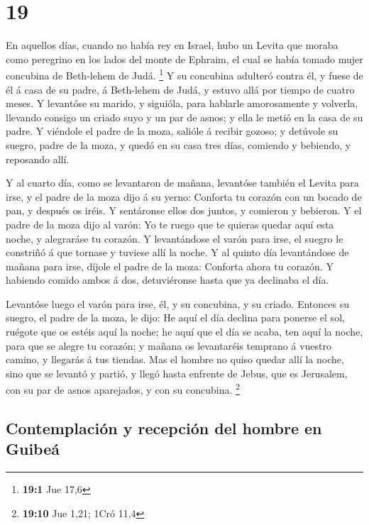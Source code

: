 \hypertarget{section-18}{%
\section{19}\label{section-18}}

 En aquellos días, cuando no había rey en Israel, hubo un
Levita que moraba como peregrino en los lados del monte de Ephraim, el
cual se había tomado mujer concubina de Beth-lehem de Judá. \footnote{\textbf{19:1}
  Jue 17,6}  Y su concubina adulteró contra él, y fuese de
él á casa de su padre, á Beth-lehem de Judá, y estuvo allá por tiempo de
cuatro meses.  Y levantóse su marido, y siguióla, para
hablarle amorosamente y volverla, llevando consigo un criado suyo y un
par de asnos; y ella le metió en la casa de su padre.  Y
viéndole el padre de la moza, salióle á recibir gozoso; y detúvole su
suegro, padre de la moza, y quedó en su casa tres días, comiendo y
bebiendo, y reposando allí.

 Y al cuarto día, como se levantaron de mañana, levantóse
también el Levita para irse, y el padre de la moza dijo á su yerno:
Conforta tu corazón con un bocado de pan, y después os iréis.
 Y sentáronse ellos dos juntos, y comieron y bebieron. Y
el padre de la moza dijo al varón: Yo te ruego que te quieras quedar
aquí esta noche, y alegraráse tu corazón.  Y levantándose
el varón para irse, el suegro le constriñó á que tornase y tuviese allí
la noche.  Y al quinto día levantándose de mañana para
irse, díjole el padre de la moza: Conforta ahora tu corazón. Y habiendo
comido ambos á dos, detuviéronse hasta que ya declinaba el día.

 Levantóse luego el varón para irse, él, y su concubina, y
su criado. Entonces su suegro, el padre de la moza, le dijo: He aquí el
día declina para ponerse el sol, ruégote que os estéis aquí la noche; he
aquí que el día se acaba, ten aquí la noche, para que se alegre tu
corazón; y mañana os levantaréis temprano á vuestro camino, y llegarás á
tus tiendas.  Mas el hombre no quiso quedar allí la
noche, sino que se levantó y partió, y llegó hasta enfrente de Jebus,
que es Jerusalem, con su par de asnos aparejados, y con su concubina.
\footnote{\textbf{19:10} Jue 1,21; 1Cró 11,4}

\hypertarget{contemplaciuxf3n-y-recepciuxf3n-del-hombre-en-guibeuxe1}{%
\subsection{Contemplación y recepción del hombre en
Guibeá}\label{contemplaciuxf3n-y-recepciuxf3n-del-hombre-en-guibeuxe1}}


